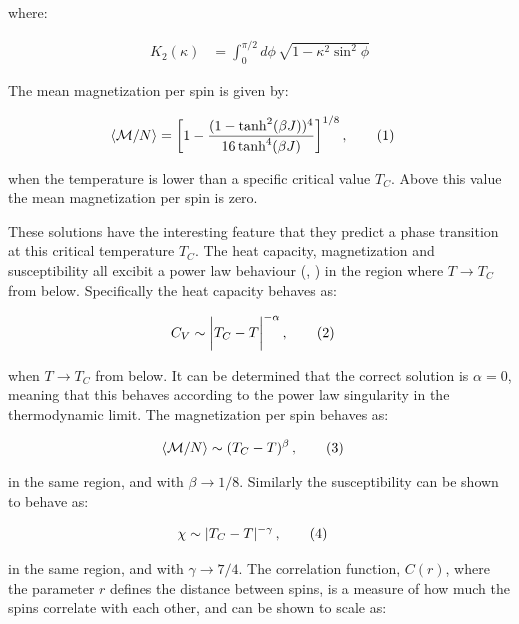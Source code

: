 \documentclass[reprint,english,notitlepage]{revtex4-1}  %
\newcommand\numberthis{\addtocounter{equation}{1}\tag{\theequation}}
\begin{document}
where:

\begin{align*}
K_2(\kappa) &= \int_0^{\pi/2} d\phi \, \sqrt{1 - \kappa^2 \sin^2 \phi}
\end{align*}

The mean magnetization per spin is given by:

\begin{align*}
\langle \mathcal{M} / N \rangle &= \bigg[1 - \frac{(1- \tanh^2 (\beta J) )^4}{16\tanh^4 (\beta J)} \bigg]^{1/8} \, , \numberthis \label{eq:LO_magnetization_per_spin}
\end{align*}

when the temperature is lower than a specific critical value $T_C$. Above this value the mean magnetization per spin is zero.

These solutions have the interesting feature that they predict a phase transition at this critical temperature $T_C$. The heat capacity, magnetization and susceptibility all excibit a power law behaviour (\citep{Stanley1999}, \cite[chapter 2.1.2]{landau_binder_2014}) in the region where $T\to T_C$ from below. Specifically the heat capacity behaves as:

\begin{align*}
C_V &\sim \bigg| T_C - T \bigg| ^{-\alpha} \, , \numberthis \label{eq:power_law_heat_capacity}
\end{align*} 

when $T\to T_C$ from below. It can be determined that the correct solution is $\alpha = 0$, meaning that this behaves according to the power law singularity in the thermodynamic limit. The magnetization per spin behaves as:

\begin{align*}
\langle \mathcal{M} / N \rangle &\sim (T_C - T)^{\beta} \, , \numberthis \label{eq:power_law_magnetization_per_spin}
\end{align*}

in the same region, and with $\beta \to 1/8$. Similarly the susceptibility can be shown to behave as:

\begin{align*}
\chi &\sim |T_C - T|^{-\gamma} \, , \numberthis \label{eq:power_law_susceptibility}
\end{align*}

in the same region, and with $\gamma \to 7/4$. The correlation function, $C(r)$, where the parameter $r$ defines the distance between spins, is a measure of how much the spins correlate with each other, and can be shown \citep{Stanley1999} to scale as:
\end{document}
